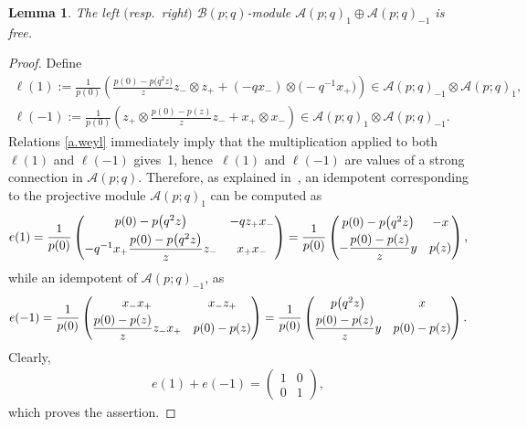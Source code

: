 \documentclass[10pt,a4paper]{amsart}
\numberwithin{equation}{section}
\newtheorem{Lemma}[Theorem]{Lemma}
\def\Weyl#1#2{{\mathcal{B}}(#1;#2)}
\def\AWeyl#1#2{{\mathcal{A}}(#1;#2)}
\begin{document}
\begin{Lemma}\label{lemma.spinor}
The left $($resp.\ right$)$ $\Weyl p q$-module $\AWeyl p q_{1} \oplus \AWeyl p q_{-1}$ is free.
\end{Lemma}
\begin{proof}
Def\/ine
\begin{gather*}
\ell(1) := \frac{1}{p(0)} \left(\frac{p(0) - p\big(q^2 z\big)}{z} z_-\otimes z_+ + (-qx_-)\otimes \big({-}q^{-1}x_+\big)\right)\in \AWeyl p q_{-1}\otimes \AWeyl p q_{1}, \\
\ell(-1) := \frac{1}{p(0)} \left({z_+} \otimes \frac{p(0) - p(z)}{z} z_- + x_+\otimes x_-\right)\in \AWeyl p q_{1}\otimes \AWeyl p q_{-1} .
\end{gather*}
Relations \eqref{a.weyl} immediately imply that the multiplication applied to both $\ell(1)$ and $\ell(-1)$ gives~1, hence~$\ell(1)$ and $\ell(-1)$ are values of a strong connection in $\AWeyl p q$. Therefore, as explained in~\cite{BrzHaj:Che}, an idempotent corresponding to the projective module $\AWeyl p q_{1} $ can be computed as
\begin{gather*}
e(1) = \frac{1}{p(0)}\begin{pmatrix}
p(0) - p\big(q^2 z\big) & -qz_+x_- \vspace{1mm}\\
-q^{-1}x_+ \dfrac{p(0) - p\big(q^2 z\big)}{z} z_- & x_+x_-
\end{pmatrix}
=
\frac{1}{p(0)}\begin{pmatrix}
p(0) - p\big(q^2 z\big) & -x \vspace{1mm}\\
- \dfrac{p(0) - p(z)}{z} y &p(z)
\end{pmatrix},
\end{gather*}
while an idempotent of $\AWeyl p q_{-1} $, as
\begin{gather*}
e(-1) = \frac{1}{p(0)}\begin{pmatrix}
x_-x_+ & x_-z_+ \vspace{1mm}\\
 \dfrac{p(0) - p(z)}{z} z_-x_+ & p(0)-p(z)
\end{pmatrix}
=
\frac{1}{p(0)}\begin{pmatrix}
p\big(q^2 z\big) & x \vspace{1mm}\\
 \dfrac{p(0) - p(z)}{z} y & p(0)-p(z)
\end{pmatrix}.
\end{gather*}
Clearly,
\begin{gather*}
e(1)+e(-1) = \begin{pmatrix}
1 & 0\\ 0 &1 \end{pmatrix},
\end{gather*}
which proves the assertion.
\end{proof}
\end{document}
